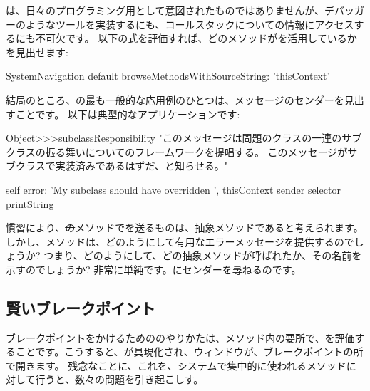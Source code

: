 \documentclass[a4paper,10pt,twoside]{book}
\begin{document}
は、日々のプログラミング用として意図されたものではありませんが、デバッガーのようなツールを実装するにも、コールスタックについての情報にアクセスするにも不可欠です。
以下の式を評価すれば、どのメソッドがを活用しているかを見出せます:

\begin{code}{}
SystemNavigation default browseMethodsWithSourceString: 'thisContext'
\end{code}

結局のところ、の最も一般的な応用例のひとつは、メッセージのセンダーを見出すことです。
以下は典型的なアプリケーションです:
\begin{code}{}
Object>>>subclassResponsibility
	"このメッセージは問題のクラスの一連のサブクラスの振る舞いについてのフレームワークを提唱する。
	このメッセージがサブクラスで実装済みであるはずだ、と知らせる。"

	self error: 'My subclass should have overridden ', thisContext sender selector printString
\end{code}

慣習により、\st のメソッドでを送るものは、抽象メソッドであると考えられます。しかし、メソッドは、どのようにして有用なエラーメッセージを提供するのでしょうか? つまり、どのようにして、どの抽象メソッドが呼ばれたか、その名前を示すのでしょうか? 非常に単純です。にセンダーを尋ねるのです。

\subsection{賢いブレークポイント}

ブレークポイントをかけるための\st のやりかたは、メソッド内の要所で、を評価することです。こうすると、が具現化され、ウィンドウが、ブレークポイントの所で開きます。
残念なことに、これを、システムで集中的に使われるメソッドに対して行うと、数々の問題を引き起こしす。
\end{document}
